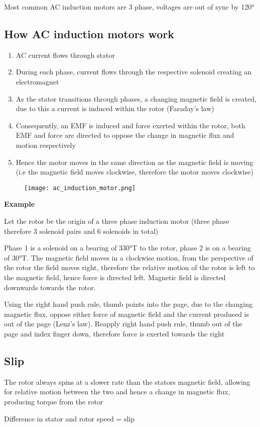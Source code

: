 	Most common AC induction motors are 3 phase, voltages are out of sync by 120°

	\subsection{How AC induction motors work}

		\begin{enumerate}
			\item AC current flows through stator
			\item During each phase, current flows through the respective solenoid creating an electromagnet
			\item As the stator transitions through phases, a changing magnetic field is created, due to this a current is induced within the rotor (Faraday's law)
			\item Consequently, an EMF is induced and force exerted within the rotor, both EMF and force are directed to oppose the change in magnetic flux and motion respectively
			\item Hence the motor moves in the same direction as the magnetic field is moving (i.e the magnetic field moves clockwise, therefore the motor moves clockwise)
		\end{enumerate}
	
		\begin{figure}[H]
			\centering
			\texttt{[image: ac\_induction\_motor.png]}
		\end{figure}

		\textbf{Example}

			Let the rotor be the origin of a three phase induction motor (three phase therefore 3 solenoid pairs and 6 solenoids in total)

			Phase 1 is a solenoid on a bearing of 330°T to the rotor, phase 2 is on a bearing of 30°T. The magnetic field moves in a clockwise motion, from the perspective of the rotor the field moves right, therefore the relative motion of the rotor is left to the magnetic field, hence force is directed left. Magnetic field is directed downwards towards the rotor.

			Using the right hand push rule, thumb points into the page, due to the changing magnetic flux, oppose either force of magnetic field and the current produced is out of the page (Lenz’s law). Reapply right hand push rule, thumb out of the page and index finger down, therefore force is exerted towards the right

	\subsection{Slip}
	
		The rotor always spins at a slower rate than the stators magnetic field, allowing for relative motion between the two and hence a change in magnetic flux, producing torque from the rotor
			
		Difference in stator and rotor speed = slip
	
